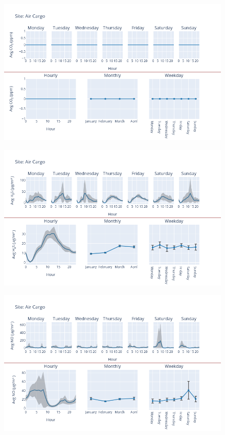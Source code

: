 \documentclass[12pt, oneside]{book}
\begin{document}
{ 
{\begin{figure}[H] 
 \centering 
\includegraphics[width=.88\textwidth, keepaspectratio]{image44} 
 \end{figure}}{} 

{\begin{figure}[H] 
 \centering 
\includegraphics[width=.88\textwidth, keepaspectratio]{image45} 
 \end{figure}}{} 

{\begin{figure}[H] 
 \centering 
\includegraphics[width=.88\textwidth, keepaspectratio]{image46} 
 \end{figure}}{} 

}
\end{document}
